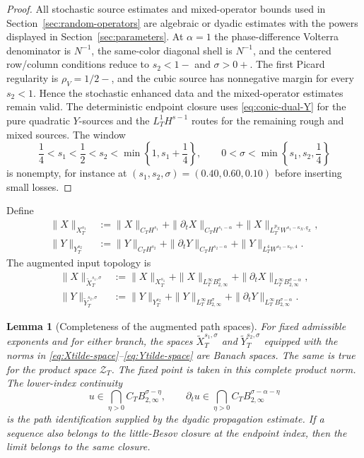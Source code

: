 \documentclass[10pt]{amsart}
\numberwithin{equation}{section}
\theoremstyle{plain}
\newtheorem{lemma}[theorem]{Lemma}
\theoremstyle{definition}
\theoremstyle{remark}
\newcommand{\Btwo}{B_{2,\infty}}
\begin{document}
\begin{proof}
All stochastic source estimates and mixed-operator bounds used in Section~\ref{sec:random-operators} are algebraic or dyadic estimates with the powers displayed in Section~\ref{sec:parameters}.  At $\alpha=1$ the phase-difference Volterra denominator is $N^{-1}$, the same-color diagonal shell is $N^{-1}$, and the centered row/column conditions reduce to $s_2<1-$ and $\sigma>0+$.  The first Picard regularity is $\rho_V=1/2-$, and the cubic source has nonnegative margin for every $s_2<1$.  Hence the stochastic enhanced data and the mixed-operator estimates remain valid.  The deterministic endpoint closure uses \eqref{eq:conic-dual-Y} for the pure quadratic $Y$-sources and the $L_T^1H^{s-1}$ routes for the remaining rough and mixed sources.  The window
\[
        \frac14<s_1<\frac12< s_2<\min\left\{1,s_1+\frac14\right\},
        \qquad 0<\sigma<\min\left\{s_1,s_2,\frac14\right\}
\]
is nonempty, for instance at $(s_1,s_2,\sigma)=(0.40,0.60,0.10)$ before inserting small losses.
\end{proof}

Define
\begin{align}
\|X\|_{X_T^{s_1}}
&:=\|X\|_{C_TH^{s_1}}+\|\partial_tX\|_{C_TH^{s_1-\alpha}}
  +\|X\|_{L_T^{p_X}W^{s_1-\kappa_X,q_X}},
\label{eq:XJ-space}\\
\|Y\|_{Y_T^{s_2}}
&:=\|Y\|_{C_TH^{s_2}}+\|\partial_tY\|_{C_TH^{s_2-\alpha}}
  +\|Y\|_{L_T^4W^{s_2-\kappa_Y,4}}.
\label{eq:YJ-space}
\end{align}
The augmented input topology is
\begin{align}
\|X\|_{\widetilde X_T^{s_1,\sigma}}
&:=\|X\|_{X_T^{s_1}}+\|X\|_{L_T^\infty\Btwo^\sigma}
      +\|\partial_tX\|_{L_T^\infty\Btwo^{\sigma-\alpha}},
\label{eq:Xtilde-space}\\
\|Y\|_{\widetilde Y_T^{s_2,\sigma}}
&:=\|Y\|_{Y_T^{s_2}}+\|Y\|_{L_T^\infty\Btwo^\sigma}
      +\|\partial_tY\|_{L_T^\infty\Btwo^{\sigma-\alpha}}.
\label{eq:Ytilde-space}
\end{align}


\begin{lemma}[Completeness of the augmented path spaces]\label{lem:augmented-path-complete}
For fixed admissible exponents and for either branch, the spaces $\widetilde X_T^{s_1,\sigma}$ and $\widetilde Y_T^{s_2,\sigma}$ equipped with the norms in \eqref{eq:Xtilde-space}--\eqref{eq:Ytilde-space} are Banach spaces.  The same is true for the product space $\mathcal Z_T$.  The fixed point is taken in this complete product norm.  The lower-index continuity
\[
        u\in \bigcap_{\eta>0} C_TB_{2,\infty}^{\sigma-\eta},
        \qquad
        \partial_tu\in \bigcap_{\eta>0} C_TB_{2,\infty}^{\sigma-\alpha-\eta}
\]
is the path identification supplied by the dyadic propagation estimate.  If a sequence also belongs to the little-Besov closure at the endpoint index, then the limit belongs to the same closure.
\end{lemma}
\end{document}
